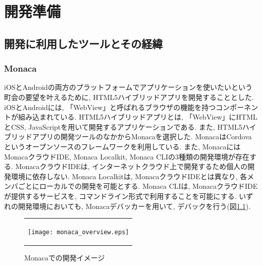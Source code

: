 \chapter{開発準備}

\section{開発に利用したツールとその経緯}%
\subsection{Monaca}%
iOSとAndroidの両方のプラットフォームでアプリケーションを使いたいという町会の要望を叶えるために, HTML5ハイブリッドアプリを開発することとした. iOSとAndroidには, 「WebView」と呼ばれるブラウザの機能を持つコンポーネントが組み込まれている\cite{book_about_monaca}. HTML5ハイブリッドアプリとは, 「WebView」にHTMLとCSS, JavaScriptを用いて開発するアプリケーションである\cite{book_about_monaca}. また, HTML5ハイブリッドアプリの開発ツールのなかからMonacaを選択した. MonacaはCordovaというオープンソースのフレームワークを利用している\cite{book_about_monaca}. また, MonacaにはMonacaクラウドIDE, Monaca Localkit, Monaca CLIの3種類の開発環境が存在する\cite{book_about_monaca}. MonacaクラウドIDEは, インターネットクラウド上で開発するため個人の開発環境に依存しない\cite{book_about_monaca}. Monaca Localkitは, MonacaクラウドIDEとは異なり, 各メンバごとにローカルでの開発を可能とする\cite{book_about_monaca}. Monaca CLIは, MonacaクラウドIDEが提供するサービスを, コマンドライン形式で利用することを可能にする\cite{book_about_monaca}. いずれの開発環境においても, Monacaデバッカーを用いて, デバックを行う(図\ref{fig:image_monaca}). 

\begin{figure}[h]
  \begin{center}
    \begin{tabular}{c}

      \begin{minipage}{0.7\hsize}
        \begin{center}
\texttt{[image: monaca\_overview.eps]}
          \hspace{1cm} %
        \end{center}
      \end{minipage}

    \end{tabular}
    \caption{Monacaでの開発イメージ\cite{monaca_debugger}}
    \label{fig:image_monaca}
  \end{center}
\end{figure}


